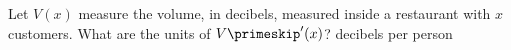 {Let $V(x)$ measure the volume, in decibels, measured inside a restaurant with $x$ customers. What are the units of $V\primeskip'(x)$?
}
{decibels per person
}
